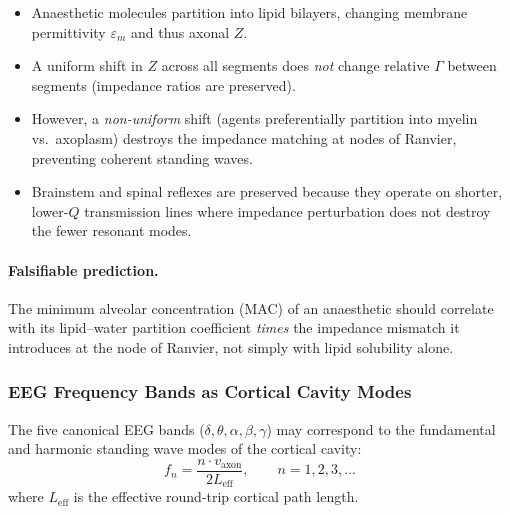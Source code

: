 \begin{itemize}
    \item Anaesthetic molecules partition into lipid bilayers,
          changing membrane permittivity $\varepsilon_m$ and
          thus axonal $Z$.
    \item A uniform shift in $Z$ across all segments does
          \emph{not} change relative $\Gamma$ between segments
          (impedance ratios are preserved).
    \item However, a \emph{non-uniform} shift (agents
          preferentially partition into myelin vs.\ axoplasm)
          destroys the impedance matching at nodes of Ranvier,
          preventing coherent standing waves.
    \item Brainstem and spinal reflexes are preserved because
          they operate on shorter, lower-$Q$ transmission
          lines where impedance perturbation does not destroy
          the fewer resonant modes.
\end{itemize}

\paragraph{Falsifiable prediction.}
The minimum alveolar concentration (MAC) of an anaesthetic
should correlate with its lipid--water partition coefficient
\emph{times} the impedance mismatch it introduces at the
node of Ranvier, not simply with lipid solubility alone.

\subsubsection{EEG Frequency Bands as Cortical Cavity Modes}
\label{sec:eeg_modes}

The five canonical EEG bands ($\delta, \theta, \alpha, \beta,
\gamma$) may correspond to the fundamental and harmonic
standing wave modes of the cortical cavity:
\begin{equation}
    f_n = \frac{n \cdot v_\text{axon}}{2 L_\text{eff}},
    \qquad n = 1, 2, 3, \ldots
    \label{eq:cortical_modes}
\end{equation}
where $L_\text{eff}$ is the effective round-trip cortical
path length.


